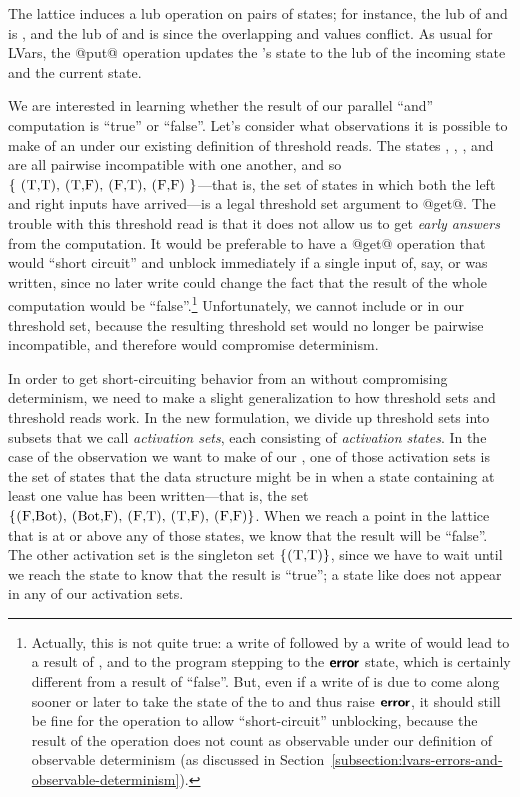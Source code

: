 The lattice induces a lub operation on pairs of states; for instance,
the lub of  and  is , and the lub of
 and  is  since the overlapping 
and  values conflict.  As usual for LVars, the @put@ operation
updates the 's state to the lub of the incoming state and
the current state.

We are interested in learning whether the result of our parallel
``and'' computation is ``true'' or ``false''.  Let's consider what
observations it is possible to make of an  under our
existing definition of threshold reads.  The states ,
, , and  are all pairwise incompatible
with one another, and so $\setof{\textrm{ \il{(T,T)}, \il{(T,F)},
    \il{(F,T)}, \il{(F,F)} }}$---that is, the set of states in which
both the left and right inputs have arrived---is a legal threshold set
argument to @get@.  The trouble with this threshold read is that it
does not allow us to get \emph{early answers} from the computation.
It would be preferable to have a @get@ operation that would ``short
circuit'' and unblock immediately if a single input of, say,
 or  was written, since no later write could
change the fact that the result of the whole computation would be
``false''.\footnote{Actually, this is not quite true: a write of
   followed by a write of  would lead to a
  result of , and to the program stepping to the $\textbf{\textsf{error}}$
  state, which is certainly different from a result of ``false''.
  But, even if a write of  is due to come along sooner or
  later to take the state of the  to  and thus raise
  $\textbf{\textsf{error}}$, it should still be fine for the  operation to
  allow ``short-circuit'' unblocking, because the result of the
   operation does not count as observable under our definition
  of observable determinism (as discussed in
  Section~\ref{subsection:lvars-errors-and-observable-determinism}).}
Unfortunately, we cannot include  or  in our
threshold set, because the resulting threshold set would no longer be
pairwise incompatible, and therefore would compromise determinism.

In order to get short-circuiting behavior from an  without
compromising determinism, we need to make a slight generalization to
how threshold sets and threshold reads work.  In the new formulation,
we divide up threshold sets into subsets that we call \emph{activation
  sets}, each consisting of \emph{activation states}.  In the case of
the observation we want to make of our , one of those
activation sets is the set of states that the data structure might be
in when a state containing at least one  value has been
written---that is, the set $\setof{ \textrm{\il{(F,Bot)},
    \il{(Bot,F)}, \il{(F,T)}, \il{(T,F)}, \il{(F,F)}} }$.  When we
reach a point in the lattice that is at or above any of those states,
we know that the result will be ``false''.  The other activation set
is the singleton set $\{ \textrm{\il{(T,T)}} \}$, since we have to
wait until we reach the state  to know that the result is
``true''; a state like  does not appear in any of our
activation sets.

